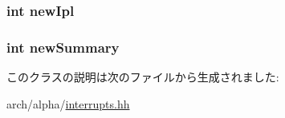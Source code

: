 \label{classAlphaISA_1_1Interrupts_af2d03360eddc7a37308f528ec004d1aa}
\hypertarget{classAlphaISA_1_1Interrupts_a1de149de9a59d4b8291c2aa655119825}{
\subsubsection[{newIpl}]{\setlength{\rightskip}{0pt plus 5cm}int {\bf newIpl}}}
\label{classAlphaISA_1_1Interrupts_a1de149de9a59d4b8291c2aa655119825}
\hypertarget{classAlphaISA_1_1Interrupts_ad13b7544dc5de8549f52b32df52e0d72}{
\subsubsection[{newSummary}]{\setlength{\rightskip}{0pt plus 5cm}int {\bf newSummary}}}
\label{classAlphaISA_1_1Interrupts_ad13b7544dc5de8549f52b32df52e0d72}


このクラスの説明は次のファイルから生成されました:\begin{DoxyCompactItemize}
\item 
arch/alpha/\hyperlink{alpha_2interrupts_8hh}{interrupts.hh}\end{DoxyCompactItemize}
